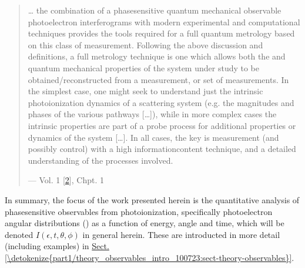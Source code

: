 \documentclass[letterpaper,table,10pt,english]{jupyterBook}
\begin{document}
\begin{quote}
\sphinxAtStartPar
… the combination of a phase\sphinxhyphen{}sensitive quantum mechanical observable \sphinxhyphen{} photoelectron interferograms \sphinxhyphen{} with modern experimental and computational techniques provides the tools required for a full quantum metrology based on this class of measurement. Following the above discussion and definitions, a full metrology technique is one which allows both the  and  quantum mechanical properties of the system under study to be obtained/reconstructed from a measurement, or set of measurements. In the simplest case, one might seek to understand just the intrinsic photoionization dynamics of a scattering system (e.g. the magnitudes and phases of the various pathways {[}…{]}), while in more complex cases the intrinsic properties are part of a probe process for additional properties or dynamics of the system {[}…{]}. In all cases, the key is measurement (and possibly control) with a high information\sphinxhyphen{}content technique, and a detailed understanding of the processes involved.

\begin{flushright}
--- Vol. 1 {[}\hyperlink{cite.backmatter/bibliography:id663}{2}{]}, Chpt. 1
\end{flushright}
\end{quote}

\sphinxAtStartPar
In summary, the focus of the work presented herein is the quantitative analysis of phase\sphinxhyphen{}sensitive observables from photoionization, specifically photoelectron angular distributions ({\hyperref[\detokenize{backmatter/glossary:term-PADs}]{}}) as a function of energy, angle and time, which will be denoted \(I(\epsilon,t,\theta,\phi)\) in general herein. These  are introducted in more detail (including examples) in \hyperref[\detokenize{part1/theory_observables_intro_100723:sect-theory-observables}]{Sect.\@ \ref{\detokenize{part1/theory_observables_intro_100723:sect-theory-observables}}}.
\end{document}
